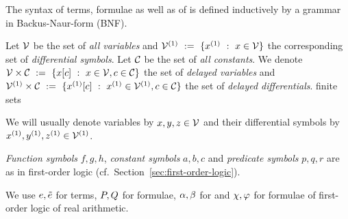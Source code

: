     The syntax of \ddL terms, formulae as well as of \dHPs is defined inductively by a grammar in Backus-Naur-form (BNF).

    Let $\mathcal{V}$ be the set of \emph{all variables} and $\diffvars\defeq\{\D{x} \with x\in\allvars\}$ the corresponding set of \emph{differential symbols}.
    Let $\mathcal{C}_{}$ be the set of \emph{all constants}. We denote $\mathcal{V}\times\mathcal{C}_{}~\mathrel{\mathop{:}}=~\{x[c] ~\mathrel{\mathop{:}}~ x\in\mathcal{V}, c\in\mathcal{C}_{}\}$ the set of \emph{delayed variables} and $\delaydiffvars\defeq\{\Dx[c] \with \D{x}\in\diffvars, c\in\constants\}$ the set of \emph{delayed differentials}.
    finite sets

    We will usually denote variables by $x,y,z\in\mathcal{V}$ and their differential symbols by $\D{x},\D{y},\D{z}\in\diffvars$.

    \emph{Function symbols} $f,g,h$, \emph{constant symbols} $a,b,c$ and \emph{predicate symbols} $p,q,r$ are as in first-order logic (cf.\ Section~\ref{sec:first-order-logic}).

    We use $e,\tilde{e}$ for \ddL terms, $P,Q$ for \ddL formulae, $\alpha,\beta$ for \dHPs and $\chi,\varphi$ for formulae of first-order logic of real arithmetic.


